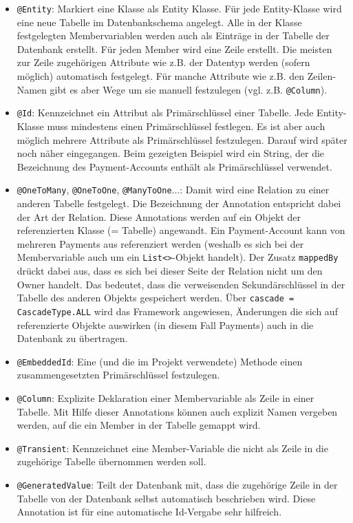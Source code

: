 \begin{itemize}
	\item \verb|@Entity|: Markiert eine Klasse als Entity Klasse. Für jede Entity-Klasse wird eine neue Tabelle im Datenbankschema angelegt. Alle in der Klasse festgelegten Membervariablen werden auch als Einträge in der Tabelle der Datenbank erstellt. Für jeden Member wird eine Zeile erstellt. Die meisten zur Zeile zugehörigen Attribute wie z.B. der Datentyp werden (sofern möglich) automatisch festgelegt. Für manche Attribute wie z.B. den Zeilen-Namen gibt es aber Wege um sie manuell festzulegen (vgl. z.B. \verb|@Column|).
	\item \verb|@Id|: Kennzeichnet ein Attribut als Primärschlüssel einer Tabelle. Jede Entity-Klasse muss mindestens einen Primärschlüssel festlegen. Es ist aber auch möglich mehrere Attribute als Primärschlüssel festzulegen. Darauf wird später noch näher eingegangen. Beim gezeigten Beispiel wird ein String, der die Bezeichnung des Payment-Accounts enthält als Primärschlüssel verwendet.
	\item \verb|@OneToMany|, \verb|@OneToOne|, \verb|@ManyToOne|...: Damit wird eine Relation zu einer anderen Tabelle festgelegt. Die Bezeichnung der Annotation entspricht dabei der Art der Relation. Diese Annotations werden auf ein Objekt der referenzierten Klasse (= Tabelle) angewandt. Ein Payment-Account kann von mehreren Payments aus referenziert werden (weshalb es sich bei der Membervariable auch um ein \verb|List<>|-Objekt handelt). Der Zusatz \verb|mappedBy| drückt dabei aus, dass es sich bei dieser Seite der Relation nicht um den Owner handelt. Das bedeutet, dass die verweisenden Sekundärschlüssel in der Tabelle des anderen Objekts gespeichert werden. Über \verb|cascade = CascadeType.ALL| wird das Framework angewiesen, Änderungen die sich auf referenzierte Objekte auswirken (in diesem Fall Payments) auch in die Datenbank zu übertragen.
	\item \verb|@EmbeddedId|: Eine (und die im Projekt verwendete) Methode einen zusammengesetzten Primärschlüssel festzulegen.
	\item \verb|@Column|: Explizite Deklaration einer Membervariable als Zeile in einer Tabelle. Mit Hilfe dieser Annotations können auch explizit Namen vergeben werden, auf die ein Member in der Tabelle gemappt wird.
	\item \verb|@Transient|: Kennzeichnet eine Member-Variable die nicht als Zeile in die zugehörige Tabelle übernommen werden soll.
	\item \verb|@GeneratedValue|: Teilt der Datenbank mit, dass die zugehörige Zeile in der Tabelle von der Datenbank selbst automatisch beschrieben wird. Diese Annotation ist für eine automatische Id-Vergabe sehr hilfreich.
\end{itemize}

